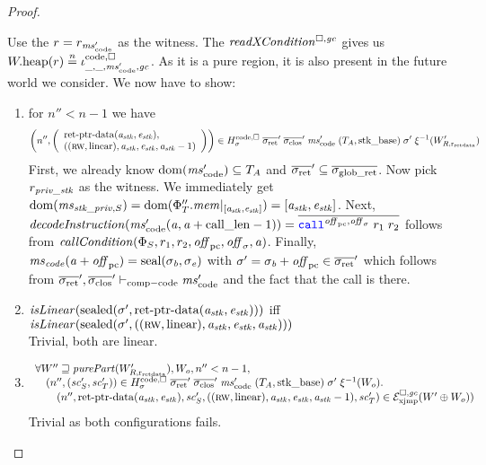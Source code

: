 \begin{proof}
\begin{description}
    Use the $r=r_{\mscode'}$ as the witness.
    The $\xReadCond{}$ gives us $\pwheap(r) \nequal \codereg{\_,\_,\mscode',\gc}$.
    As it is a pure region, it is also present in the future world we consider.
    We now have to show:
    \begin{enumerate}[label=\alph*)]
    \item for $n'' < n-1$ we have
      \[\npair[n'']{\left(\array{l}\retptrd(\aaddr_\stk,\eaddr_\stk),\\((\rw,\linear),\aaddr_\stk,\eaddr_\stk,\aaddr_\stk-1)\endarray\right)}
        \in H^\mathrm{code,\square}_\sigma \; \sigrets' \; \sigcloss' \; \mscode'
        \; (\ta,\stkb) \; \sigma' \; \xi^{-1}(W_{R,\rretd}')
      \]
      First, we already know $\dom(\mscode') \subseteq \ta$ and $\sigrets' \subseteq \gsigrets$.
      Now pick $r_{\mathit{priv\_stk}}$ as the witness.
      We immediately get $\mathrm{dom}(\mathit{ms}_{\mathit{stk}\_\mathit{priv},S}) = \mathrm{dom}(\Phi_T''.\mathit{mem}|_{[\mathit{a}_{\mathit{stk}},\mathit{e}_{\mathit{stk}}]}) = [\mathit{a}_{\mathit{stk}},\mathit{e}_{\mathit{stk}}]$.
      Next, $\decInstr{\mscode'(\aaddr,\aaddr+\calllen-1)} = \overline{\scall{\offpc,\offsigma}{r_1}{r_2}}$ follows from $\callCond{\Phi_S,r_1,r_2,\offpc,\offsigma,\aaddr}$.
      Finally, $\mathit{ms}_{\mathit{code}}(\mathit{a}+\mathit{off}_{\mathrm{pc}}) = \mathrm{seal}(\sigma_{\mathit{b}},\sigma_{\mathit{e}})$ with $\sigma' = \sigma_\baddr + \offpc \in \sigrets'$ which follows from $\sigrets',\sigcloss' \vdash_{\mathrm{comp-code}} \mscode'$ and the fact that the call is there.
    \item $\isLinear{\sealed{\sigma',\retptrd(\aaddr_\stk,\eaddr_\stk)}}$ iff
      $\isLinear{\sealed{\sigma',((\rw,\linear),\aaddr_\stk,\eaddr_\stk,\aaddr_\stk)}}$\\
      Trivial, both are linear.
    \item
      \[
        \begin{array}{l}
          \forall W'' \future \purePart{W_{R,\rretd}'}, W_o, n'' < n-1,\\
          \quad\npair[n'']{(\vsc_S',\vsc_T')}
          \in  H^\mathrm{code,\square}_\sigma \; \sigrets' \; \sigcloss' \; \mscode'
          \; (\ta,\stkb) \; \sigma' \; \xi^{-1}(W_o) \ldotp \\
          \qquad\npair[n'']{\retptrd(\aaddr_\stk,\eaddr_\stk),\vsc_S',((\rw,\linear),\aaddr_\stk,\eaddr_\stk,\aaddr_\stk-1),\vsc_T'} \in
          \lrexj(W'\oplus W_o))
        \end{array}
      \]
      Trivial as both configurations fails.
    \end{enumerate}


\end{description}
\end{proof}
